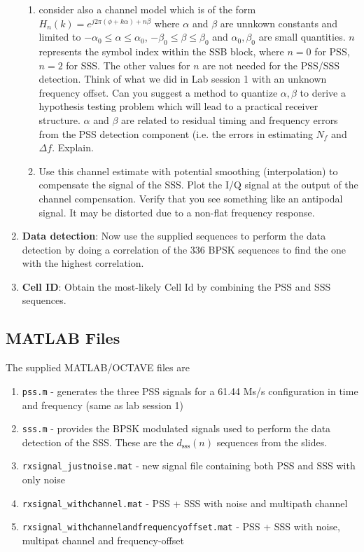 \documentclass[a4paper,10pt]{article}
\begin{document}
\begin{enumerate}
\begin{enumerate}
\item consider also a channel model which is of the form $H_n(k) = e^{j2\pi(\phi + k\alpha) + n\beta}$ where $\alpha$ and $\beta$ are unnkown constants and limited to $-\alpha_0\leq\alpha\leq\alpha_0$, $-\beta_0\leq\beta\leq\beta_0$ and $\alpha_0,\beta_0$ are small quantities. $n$ represents the symbol index within the SSB block, where $n=0$ for PSS, $n=2$ for SSS. The other values for $n$ are not needed for the PSS/SSS detection. Think of what we did in Lab session 1 with an unknown frequency offset. Can you suggest a method to quantize $\alpha,\beta$ to derive a hypothesis testing problem which will lead to a practical receiver structure. $\alpha$ and $\beta$ are related to residual timing and frequency errors from the PSS detection component (i.e. the errors in estimating $N_f$ and $\Delta f$. Explain. 
\item Use this channel estimate with potential smoothing (interpolation) to compensate the signal of the SSS.  Plot the I/Q signal at the output of the channel compensation.  Verify that you see something like an antipodal signal.  It may be distorted due to a non-flat frequency response. 
\end{enumerate}
\item {\bf Data detection}: Now use the supplied sequences to perform the data detection by doing a correlation of the 336 BPSK sequences to find the one with the highest correlation.
\item {\bf Cell ID}: Obtain the most-likely Cell Id by combining the PSS and SSS sequences. 
\end{enumerate}


\subsection{MATLAB Files}
The supplied MATLAB/OCTAVE files are
\begin{enumerate}
\item {\tt pss.m} - generates the three PSS signals for a 61.44 Ms/s configuration in time and frequency (same as lab session 1)
\item {\tt sss.m} - provides the BPSK modulated signals used to perform the data detection of the SSS. These are the $d_{\mathrm{sss}}(n)$ sequences from the slides.
\item {\tt rxsignal\_justnoise.mat} - new signal file containing both PSS and SSS with only noise
\item {\tt rxsignal\_withchannel.mat} - PSS + SSS with noise and multipath channel
\item {\tt rxsignal\_withchannelandfrequencyoffset.mat} - PSS + SSS with noise, multipat channel and frequency-offset 
\end{enumerate}
\end{document}
